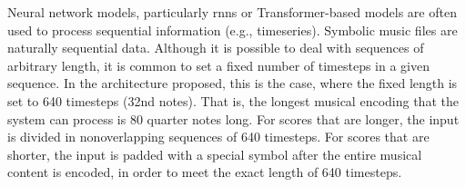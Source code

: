 
Neural network models, particularly \glspl{rnn} or
Transformer-based models are often used to process
sequential information (e.g., timeseries). Symbolic music
files are naturally sequential data. Although it is possible
to deal with sequences of arbitrary length, it is common to
set a fixed number of timesteps in a given sequence. In the
architecture proposed, this is the case, where the fixed
length is set to 640 timesteps (32nd notes). That is, the
longest musical encoding that the system can process is 80
quarter notes long. For scores that are longer, the input is
divided in nonoverlapping sequences of 640 timesteps. For
scores that are shorter, the input is padded with a special
symbol after the entire musical content is encoded, in order
to meet the exact length of 640 timesteps.